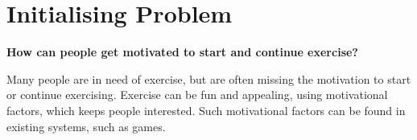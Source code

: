 \section{Initialising Problem}\label{section:initialising-problem}
\begin{center}
\textbf{How can people get motivated to start and continue exercise?}
\end{center}

Many people are in need of exercise, but are often missing the motivation to start or continue exercising. 
Exercise can be fun and appealing, using motivational factors, which keeps people interested. 
Such motivational factors can be found in existing systems, such as games.